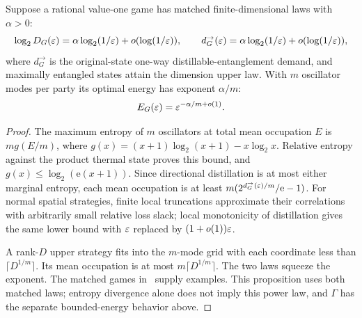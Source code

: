 \begin{proposition}\label{prop:oscillator-exponent}
Suppose a rational value-one game has matched finite-dimensional laws with $\alpha>0$:
\[
 \log_2D_G(\varepsilon)=\alpha\log_2(1/\varepsilon)+o(\log(1/\varepsilon)),\qquad
 d_G^\to(\varepsilon)=\alpha\log_2(1/\varepsilon)+o(\log(1/\varepsilon)),
\]
where $d_G^\to$ is the original-state one-way distillable-entanglement demand, and maximally entangled states attain the dimension upper law. With $m$ oscillator modes per party its optimal energy has exponent $\alpha/m$:
\[
 E_G(\varepsilon)=\varepsilon^{-\alpha/m+o(1)}.
\]
\end{proposition}
\begin{proof}
The maximum entropy of $m$ oscillators at total mean occupation $E$ is $m g(E/m)$, where $g(x)=(x+1)\log_2(x+1)-x\log_2x$. Relative entropy against the product thermal state proves this bound, and $g(x)\le\log_2(\mathrm e(x+1))$. Since directional distillation is at most either marginal entropy, each mean occupation is at least $m(2^{d_G^\to(\varepsilon)/m}/\mathrm e-1)$. For normal spatial strategies, finite local truncations approximate their correlations with arbitrarily small relative loss slack; local monotonicity of distillation gives the same lower bound with $\varepsilon$ replaced by $(1+o(1))\varepsilon$.

A rank-$D$ upper strategy fits into the $m$-mode grid with each coordinate less than $\lceil D^{1/m}\rceil$. Its mean occupation is at most $m\lceil D^{1/m}\rceil$. The two laws squeeze the exponent. The matched games in~\cite{DMprice} supply examples. This proposition uses both matched laws; entropy divergence alone does not imply this power law, and $\Gamma$ has the separate bounded-energy behavior above.
\end{proof}


